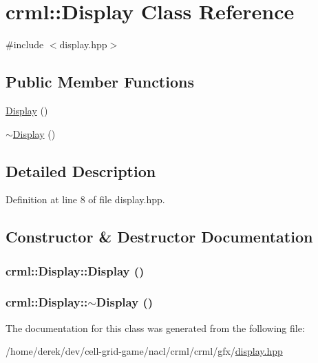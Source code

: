 \hypertarget{classcrml_1_1_display}{
\section{crml::Display Class Reference}
\label{classcrml_1_1_display}
}


{\ttfamily \#include $<$display.hpp$>$}

\subsection*{Public Member Functions}
\begin{DoxyCompactItemize}
\item 
\hyperlink{classcrml_1_1_display_a7ace484d6186f2ea1929a801bb0b926f}{Display} ()
\item 
\hyperlink{classcrml_1_1_display_a0e2d1255255be803ee04e0880ca79bea}{$\sim$Display} ()
\end{DoxyCompactItemize}


\subsection{Detailed Description}


Definition at line 8 of file display.hpp.



\subsection{Constructor \& Destructor Documentation}
\hypertarget{classcrml_1_1_display_a7ace484d6186f2ea1929a801bb0b926f}{
\subsubsection[{Display}]{\setlength{\rightskip}{0pt plus 5cm}crml::Display::Display ()}}
\label{classcrml_1_1_display_a7ace484d6186f2ea1929a801bb0b926f}
\hypertarget{classcrml_1_1_display_a0e2d1255255be803ee04e0880ca79bea}{
\subsubsection[{$\sim$Display}]{\setlength{\rightskip}{0pt plus 5cm}crml::Display::$\sim$Display ()}}
\label{classcrml_1_1_display_a0e2d1255255be803ee04e0880ca79bea}


The documentation for this class was generated from the following file:\begin{DoxyCompactItemize}
\item 
/home/derek/dev/cell-\/grid-\/game/nacl/crml/crml/gfx/\hyperlink{display_8hpp}{display.hpp}\end{DoxyCompactItemize}
